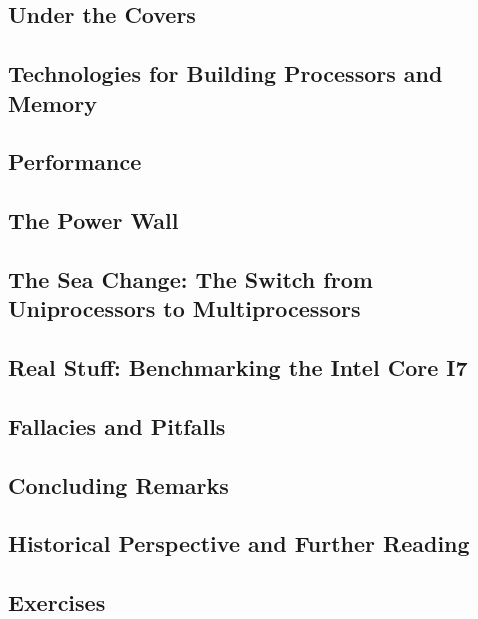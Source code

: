 \documentclass{article}
\begin{document}
		\subsection{Under the Covers}
		
		\subsection{Technologies for Building Processors and Memory}
		
		\subsection{Performance}
		
		\subsection{The Power Wall}
		
		\subsection{The Sea Change: The Switch from Uniprocessors to Multiprocessors}
		
		\subsection{Real Stuff: Benchmarking the Intel Core I7}
		
		\subsection{Fallacies and Pitfalls}
		
		\subsection{Concluding Remarks}
		
		\subsection{Historical Perspective and Further Reading}
		
		\subsection{Exercises}
\end{document}
